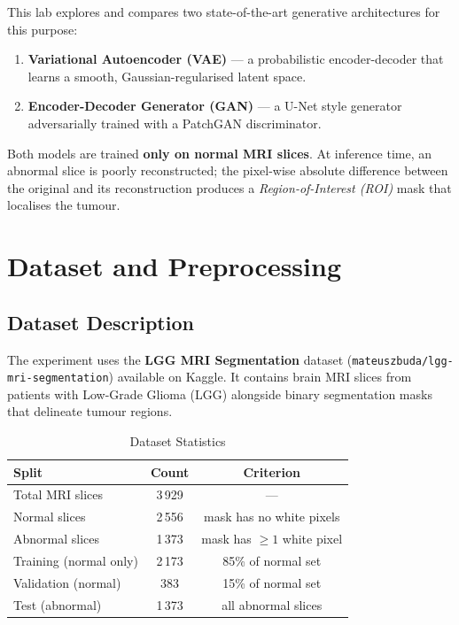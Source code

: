 \documentclass[12pt,a4paper]{article}
\begin{document}
This lab explores and compares two state-of-the-art generative architectures for this purpose:

\begin{enumerate}[leftmargin=1.6cm]
    \item \textbf{Variational Autoencoder (VAE)} --- a probabilistic encoder-decoder that
          learns a smooth, Gaussian-regularised latent space.
    \item \textbf{Encoder-Decoder Generator (GAN)} --- a U-Net style generator adversarially
          trained with a PatchGAN discriminator.
\end{enumerate}

Both models are trained \textbf{only on normal MRI slices}.  At inference time, an abnormal
slice is poorly reconstructed; the pixel-wise absolute difference between the original and its
reconstruction produces a \emph{Region-of-Interest (ROI)} mask that localises the tumour.

\section{Dataset and Preprocessing}
\label{sec:data}

\subsection{Dataset Description}

The experiment uses the \textbf{LGG MRI Segmentation} dataset
(\texttt{mateuszbuda/lgg-mri-segmentation}) available on Kaggle.  It contains brain MRI slices
from patients with Low-Grade Glioma (LGG) alongside binary segmentation masks that delineate
tumour regions.

\begin{table}[H]
\centering
\caption{Dataset Statistics}
\label{tab:dataset}
\begin{tabular}{lcc}
\toprule
\textbf{Split}           & \textbf{Count} & \textbf{Criterion} \\
\midrule
Total MRI slices         & 3\,929 & --- \\
Normal slices            & 2\,556 & mask has no white pixels \\
Abnormal slices          & 1\,373 & mask has $\geq 1$ white pixel \\
\midrule
Training (normal only)   & 2\,173 & 85\% of normal set \\
Validation (normal)      &   383  & 15\% of normal set \\
Test (abnormal)          & 1\,373 & all abnormal slices \\
\bottomrule
\end{tabular}
\end{table}
\end{document}
